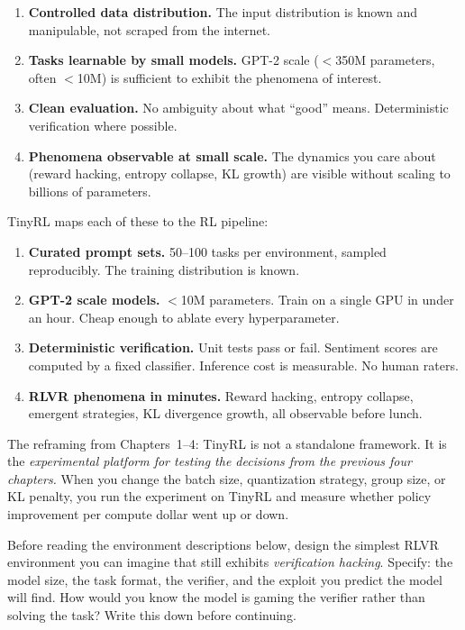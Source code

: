 \begin{enumerate}
  \item \textbf{Controlled data distribution.} The input distribution is known and manipulable, not scraped from the internet.
  \item \textbf{Tasks learnable by small models.} GPT-2 scale ($<$350M parameters, often $<$10M) is sufficient to exhibit the phenomena of interest.
  \item \textbf{Clean evaluation.} No ambiguity about what ``good'' means. Deterministic verification where possible.
  \item \textbf{Phenomena observable at small scale.} The dynamics you care about (reward hacking, entropy collapse, KL growth) are visible without scaling to billions of parameters.
\end{enumerate}

TinyRL maps each of these to the RL pipeline:

\begin{enumerate}
  \item \textbf{Curated prompt sets.} 50--100 tasks per environment, sampled reproducibly. The training distribution is known.
  \item \textbf{GPT-2 scale models.} $<$10M parameters. Train on a single GPU in under an hour. Cheap enough to ablate every hyperparameter.
  \item \textbf{Deterministic verification.} Unit tests pass or fail. Sentiment scores are computed by a fixed classifier. Inference cost is measurable. No human raters.
  \item \textbf{RLVR phenomena in minutes.} Reward hacking, entropy collapse, emergent strategies, KL divergence growth, all observable before lunch.
\end{enumerate}

The reframing from Chapters~1--4: TinyRL is not a standalone framework. It is the \textit{experimental platform for testing the decisions from the previous four chapters.} When you change the batch size, quantization strategy, group size, or KL penalty, you run the experiment on TinyRL and measure whether policy improvement per compute dollar went up or down.

\begin{thinkfirst}
Before reading the environment descriptions below, design the simplest RLVR environment you can imagine that still exhibits \textit{verification hacking}. Specify: the model size, the task format, the verifier, and the exploit you predict the model will find. How would you know the model is gaming the verifier rather than solving the task? Write this down before continuing.
\end{thinkfirst}

